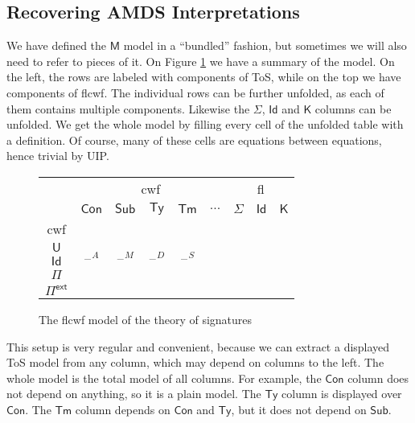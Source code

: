 \documentclass[12pt,a4paper,twoside,openany]{book}
\theoremstyle{remark}
\theoremstyle{definition}
\theoremstyle{theorem}
\newcommand{\bs}[1]{\boldsymbol{#1}}
\newcommand{\Con}{\mathsf{Con}}
\newcommand{\Sub}{\mathsf{Sub}}
\newcommand{\Tm}{\mathsf{Tm}}
\newcommand{\Ty}{\mathsf{Ty}}
\newcommand{\U}{\mathsf{U}}
\newcommand{\Id}{\mathsf{Id}}
\newcommand{\blank}{\mathord{\hspace{1pt}\text{--}\hspace{1pt}}}
\newcommand{\Pie}{\Pi^{\mathsf{ext}}}
\newcommand{\K}{\mathsf{K}}
\newcommand{\bM}{\bs{\mathsf{M}}}
\begin{document}
\subsection{Recovering AMDS Interpretations}

We have defined the $\bM$ model in a ``bundled'' fashion, but sometimes we will
also need to refer to pieces of it. On Figure \ref{fig:fqiit-model} we have a
summary of the model. On the left, the rows are labeled with components of ToS,
while on the top we have components of flcwf. The individual rows can be further
unfolded, as each of them contains multiple components. Likewise the $\Sigma$,
$\Id$ and $\K$ columns can be unfolded. We get the whole model by filling every
cell of the unfolded table with a definition. Of course, many of these cells are
equations between equations, hence trivial by UIP.

\begin{figure}
\begin{center}
\begin{tabular}{ |c|c|c|c|c|c|c|c|c|  }
 \hline
   & \multicolumn{5}{|c|}{cwf} & \multicolumn{3}{c|}{fl}\\
 \cline{2-9}
   & $\Con$ & $\Sub$ & $\Ty$ & $\Tm$ & $...$ & $\Sigma$ & $\Id$ & $\K$ \\
 \hline
   cwf    & \multirow{5}{2em}{$\blank^A$}&\multirow{5}{2em}{$\blank^M$}&\multirow{5}{2em}{$\blank^D$}&\multirow{5}{2em}{$\blank^S$}& & & & \\
   $\U$   &                              &              &                  &    & & & & \\
   $\Id$  &                              &              &                  &    & & & & \\
   $\Pi$  &                              &              &                  &    & & & & \\
   $\Pie$ &                              &              &                  &    & & & & \\
 \hline
\end{tabular}
\end{center}
\caption{The flcwf model of the theory of signatures}
\label{fig:fqiit-model}
\end{figure}

This setup is very regular and convenient, because we can extract a displayed
ToS model from any column, which may depend on columns to the left. The whole
model is the total model of all columns. For example, the $\Con$ column does not
depend on anything, so it is a plain model. The $\Ty$ column is displayed over
$\Con$. The $\Tm$ column depends on $\Con$ and $\Ty$, but it does not depend on $\Sub$.
\end{document}
